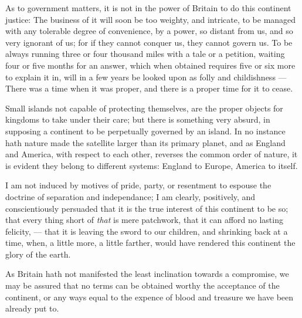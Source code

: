 \documentclass[12pt, twocolumn]{book}
\begin{document}
    As to government matters, it is not in the power of Britain to do this continent justice: The business of it will soon be too weighty, and intricate, to be managed with any tolerable degree of convenience, by a power, so distant from us, and so very ignorant of us; for if they cannot conquer us, they cannot govern us. To be always running three or four thousand miles with a tale or a petition, waiting four or five months for an answer, which when obtained requires five or six more to explain it in, will in a few years be looked upon as folly and childishness — There was a time when it was proper, and there is a proper time for it to cease.

    Small islands not capable of protecting themselves, are the proper objects for kingdoms to take under their care; but there is something very absurd, in supposing a continent to be perpetually governed by an island. In no instance hath nature made the satellite larger than its primary planet, and as England and America, with respect to each other, reverses the common order of nature, it is evident they belong to different systems: England to Europe, America to itself.

    I am not induced by motives of pride, party, or resentment to espouse the doctrine of separation and independance; I am clearly, positively, and conscientiously persuaded that it is the true interest of this continent to be so; that every thing short of \textit{that} is mere patchwork, that it can afford no lasting felicity, — that it is leaving the sword to our children, and shrinking back at a time, when, a little more, a little farther, would have rendered this continent the glory of the earth.

    As Britain hath not manifested the least inclination towards a compromise, we may be assured that no terms can be obtained worthy the acceptance of the continent, or any ways equal to the expence of blood and treasure we have been already put to.
\end{document}
